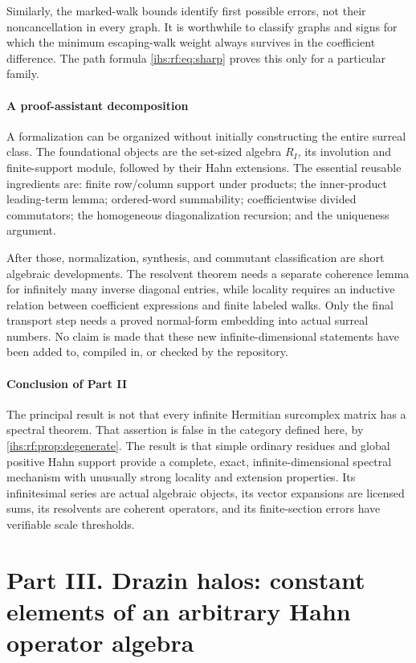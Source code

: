 \documentclass[11pt,a4paper]{article}
\numberwithin{equation}{section}
\theoremstyle{definition}
\theoremstyle{remark}
\begin{document}
Similarly, the marked-walk bounds identify first possible errors, not their
noncancellation in every graph. It is worthwhile to classify graphs and
signs for which the minimum escaping-walk weight always survives in the
coefficient difference. The path formula \eqref{ihs:rf:eq:sharp} proves this
only for a particular family.

\subsection{A proof-assistant decomposition}\label{ihs:rf:sec:formalization}
A formalization can be organized without initially constructing the entire
surreal class. The foundational objects are the set-sized algebra $R_I$, its
involution and finite-support module, followed by their Hahn extensions. The
essential reusable ingredients are: finite row/column support under
products; the inner-product leading-term lemma; ordered-word summability;
coefficientwise divided commutators; the homogeneous diagonalization
recursion; and the uniqueness argument.

After those, normalization, synthesis, and commutant classification are
short algebraic developments. The resolvent theorem needs a separate
coherence lemma for infinitely many inverse diagonal entries, while locality
requires an inductive relation between coefficient expressions and finite
labeled walks. Only the final transport step needs a proved normal-form
embedding into actual surreal numbers. No claim is made that these new
infinite-dimensional statements have been added to, compiled in, or checked
by the repository.

\subsection{Conclusion of Part II}\label{ihs:rf:sec:conclusion}
The principal result is not that every infinite Hermitian surcomplex matrix
has a spectral theorem. That assertion is false in the category defined
here, by \cref{ihs:rf:prop:degenerate}. The result is that simple ordinary
residues and global positive Hahn support provide a complete, exact,
infinite-dimensional spectral mechanism with unusually strong locality and
extension properties. Its infinitesimal series are actual algebraic objects,
its vector expansions are licensed sums, its resolvents are coherent
operators, and its finite-section errors have verifiable scale thresholds.

\clearpage
\part*{Part III. Drazin halos: constant elements of an arbitrary Hahn operator algebra}
\end{document}
